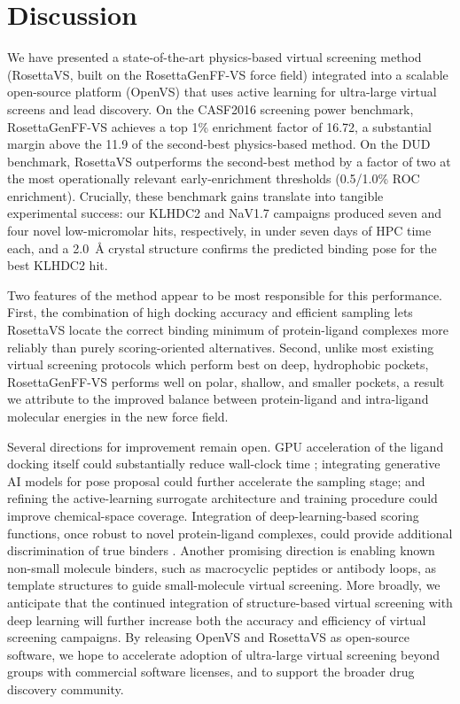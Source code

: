 \documentclass[11pt]{article}
\begin{document}
\section{Discussion}
We have presented a state-of-the-art physics-based virtual screening method (RosettaVS, built on the RosettaGenFF-VS force field) integrated into a scalable open-source platform (OpenVS) that uses active learning for ultra-large virtual screens and lead discovery. On the CASF2016 screening power benchmark, RosettaGenFF-VS achieves a top 1\% enrichment factor of 16.72, a substantial margin above the 11.9 of the second-best physics-based method. On the DUD benchmark, RosettaVS outperforms the second-best method by a factor of two at the most operationally relevant early-enrichment thresholds (0.5/1.0\% ROC enrichment). Crucially, these benchmark gains translate into tangible experimental success: our KLHDC2 and NaV1.7 campaigns produced seven and four novel low-micromolar hits, respectively, in under seven days of HPC time each, and a 2.0~\AA{} crystal structure confirms the predicted binding pose for the best KLHDC2 hit.

Two features of the method appear to be most responsible for this performance. First, the combination of high docking accuracy and efficient sampling lets RosettaVS locate the correct binding minimum of protein-ligand complexes more reliably than purely scoring-oriented alternatives. Second, unlike most existing virtual screening protocols which perform best on deep, hydrophobic pockets, RosettaGenFF-VS performs well on polar, shallow, and smaller pockets, a result we attribute to the improved balance between protein-ligand and intra-ligand molecular energies in the new force field.

Several directions for improvement remain open. GPU acceleration of the ligand docking itself could substantially reduce wall-clock time \citep{tang2022uniDock}; integrating generative AI models for pose proposal \citep{corso2023diffdock,stark2022equibind} could further accelerate the sampling stage; and refining the active-learning surrogate architecture and training procedure could improve chemical-space coverage. Integration of deep-learning-based scoring functions, once robust to novel protein-ligand complexes, could provide additional discrimination of true binders \citep{jimenez2018kdeep,meli2023scoring}. Another promising direction is enabling known non-small molecule binders, such as macrocyclic peptides or antibody loops, as template structures to guide small-molecule virtual screening. More broadly, we anticipate that the continued integration of structure-based virtual screening with deep learning \citep{jumper2021alphafold,baek2021rosettafold,stokes2020deep,merchant2023scaling} will further increase both the accuracy and efficiency of virtual screening campaigns. By releasing OpenVS and RosettaVS as open-source software, we hope to accelerate adoption of ultra-large virtual screening beyond groups with commercial software licenses, and to support the broader drug discovery community.



\end{document}
